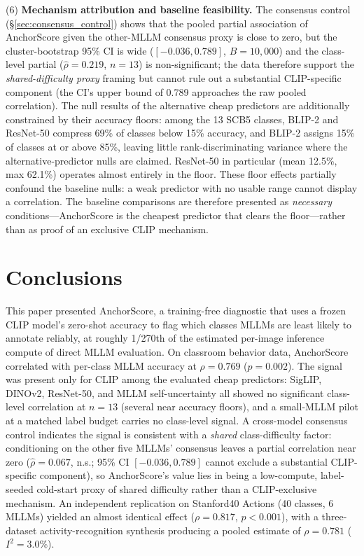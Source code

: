 \documentclass[a4paper,fleqn]{cas-sc}
\begin{document}
(6) \textbf{Mechanism attribution and baseline feasibility.} The consensus control (\S\ref{sec:consensus_control}) shows that the pooled partial association of AnchorScore given the other-MLLM consensus proxy is close to zero, but the cluster-bootstrap 95\% CI is wide ($[-0.036,0.789]$, $B=10{,}000$) and the class-level partial ($\hat{\rho}=0.219$, $n=13$) is non-significant; the data therefore support the \emph{shared-difficulty proxy} framing but cannot rule out a substantial CLIP-specific component (the CI's upper bound of 0.789 approaches the raw pooled correlation). The null results of the alternative cheap predictors are additionally constrained by their accuracy floors: among the 13 SCB5 classes, BLIP-2 and ResNet-50 compress 69\% of classes below 15\% accuracy, and BLIP-2 assigns 15\% of classes at or above 85\%, leaving little rank-discriminating variance where the alternative-predictor nulls are claimed. ResNet-50 in particular (mean 12.5\%, max 62.1\%) operates almost entirely in the floor. These floor effects partially confound the baseline nulls: a weak predictor with no usable range cannot display a correlation. The baseline comparisons are therefore presented as \emph{necessary} conditions---AnchorScore is the cheapest predictor that clears the floor---rather than as proof of an exclusive CLIP mechanism.


\section{Conclusions}
\label{sec:conclusion}

This paper presented AnchorScore, a training-free diagnostic that uses a frozen CLIP model's zero-shot accuracy to flag which classes MLLMs are least likely to annotate reliably, at roughly 1/270th of the estimated per-image inference compute of direct MLLM evaluation. On classroom behavior data, AnchorScore correlated with per-class MLLM accuracy at $\rho=0.769$ ($p=0.002$). The signal was present only for CLIP among the evaluated cheap predictors: SigLIP, DINOv2, ResNet-50, and MLLM self-uncertainty all showed no significant class-level correlation at $n=13$ (several near accuracy floors), and a small-MLLM pilot at a matched label budget carries no class-level signal. A cross-model consensus control indicates the signal is consistent with a \emph{shared} class-difficulty factor: conditioning on the other five MLLMs' consensus leaves a partial correlation near zero ($\hat{\rho}=0.067$, n.s.; 95\% CI $[-0.036, 0.789]$ cannot exclude a substantial CLIP-specific component), so AnchorScore's value lies in being a low-compute, label-seeded cold-start proxy of shared difficulty rather than a CLIP-exclusive mechanism. An independent replication on Stanford40 Actions (40 classes, 6 MLLMs) yielded an almost identical effect ($\rho=0.817$, $p<0.001$), with a three-dataset activity-recognition synthesis producing a pooled estimate of $\rho=0.781$ ($I^2=3.0\%$).
 
\end{document}
